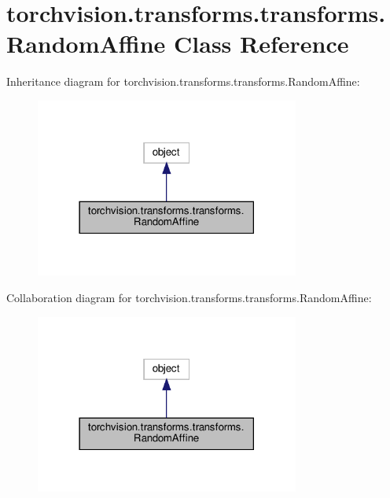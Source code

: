 \hypertarget{classtorchvision_1_1transforms_1_1transforms_1_1RandomAffine}{}\section{torchvision.\+transforms.\+transforms.\+Random\+Affine Class Reference}
\label{classtorchvision_1_1transforms_1_1transforms_1_1RandomAffine}


Inheritance diagram for torchvision.\+transforms.\+transforms.\+Random\+Affine\+:
\nopagebreak
\begin{figure}[H]
\begin{center}
\leavevmode
\includegraphics[width=246pt]{classtorchvision_1_1transforms_1_1transforms_1_1RandomAffine__inherit__graph}
\end{center}
\end{figure}


Collaboration diagram for torchvision.\+transforms.\+transforms.\+Random\+Affine\+:
\nopagebreak
\begin{figure}[H]
\begin{center}
\leavevmode
\includegraphics[width=246pt]{classtorchvision_1_1transforms_1_1transforms_1_1RandomAffine__coll__graph}
\end{center}
\end{figure}
